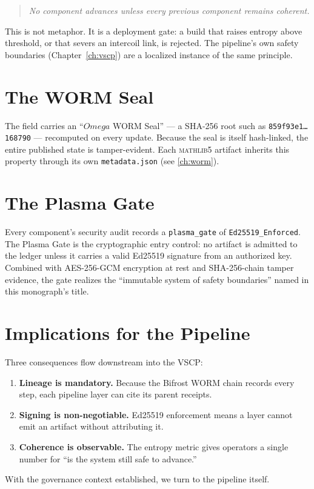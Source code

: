 \begin{quote}
\itshape No component advances unless every previous component remains
coherent.
\end{quote}

This is not metaphor. It is a deployment gate: a build that raises entropy
above threshold, or that severs an intercoil link, is rejected. The pipeline's
own safety boundaries (Chapter~\ref{ch:vscp}) are a localized instance of the
same principle.

\section{The WORM Seal}
\label{sec:coh-seal}

The field carries an ``\ensuremath{Omega} WORM Seal'' --- a SHA-256 root such as
\texttt{859f93e1\ldots168790} --- recomputed on every update. Because the seal
is itself hash-linked, the entire published state is tamper-evident. Each
\textsc{mathlib5} artifact inherits this property through its own
\texttt{metadata.json} (see \cref{ch:worm}).

\section{The Plasma Gate}
\label{sec:coh-plasma}

Every component's security audit records a \texttt{plasma\_gate} of
\texttt{Ed25519\_Enforced}. The Plasma Gate is the cryptographic entry
control: no artifact is admitted to the ledger unless it carries a valid
Ed25519 signature from an authorized key. Combined with AES-256-GCM
encryption at rest and SHA-256-chain tamper evidence, the gate realizes the
``immutable system of safety boundaries'' named in this monograph's title.

\section{Implications for the Pipeline}
\label{sec:coh-impl}

Three consequences flow downstream into the VSCP:
\begin{enumerate}
  \item \textbf{Lineage is mandatory.} Because the Bifrost WORM chain records
        every step, each pipeline layer can cite its parent receipts.
  \item \textbf{Signing is non-negotiable.} Ed25519 enforcement means a layer
        cannot emit an artifact without attributing it.
  \item \textbf{Coherence is observable.} The entropy metric gives operators a
        single number for ``is the system still safe to advance.''
\end{enumerate}
With the governance context established, we turn to the pipeline itself.
